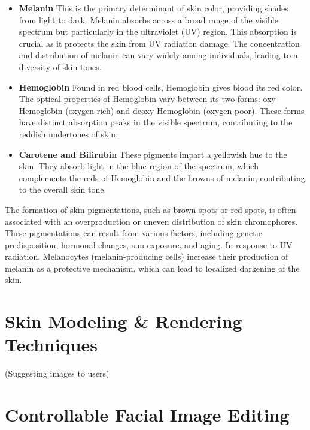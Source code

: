 \begin{spacing}{1.5}
\begin{itemize}
    \item \textbf{Melanin} This is the primary determinant of skin color, providing shades from light to dark. Melanin absorbs across a broad range of the visible spectrum but particularly in the ultraviolet (UV) region. This absorption is crucial as it protects the skin from UV radiation damage. The concentration and distribution of melanin can vary widely among individuals, leading to a diversity of skin tones.
    \item \textbf{Hemoglobin} Found in red blood cells, Hemoglobin gives blood its red color. The optical properties of Hemoglobin vary between its two forms: oxy-Hemoglobin (oxygen-rich) and deoxy-Hemoglobin (oxygen-poor). These forms have distinct absorption peaks in the visible spectrum, contributing to the reddish undertones of skin.
    \item \textbf{Carotene and Bilirubin} These pigments impart a yellowish hue to the skin. They absorb light in the blue region of the spectrum, which complements the reds of Hemoglobin and the browns of melanin, contributing to the overall skin tone.

\end{itemize}

The formation of skin pigmentations, such as brown spots or red spots, is often associated with an overproduction or uneven distribution of skin chromophores. These pigmentations can result from various factors, including genetic predisposition, hormonal changes, sun exposure, and aging. In response to UV radiation, Melanocytes (melanin-producing cells) increase their production of melanin as a protective mechanism, which can lead to localized darkening of the skin.

\section{Skin Modeling \& Rendering Techniques}
(Suggesting images to users)

\section{Controllable Facial Image Editing}



\end{spacing}
